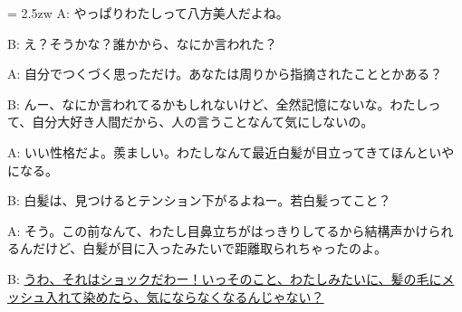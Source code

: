 \documentclass[11pt]{amsart}
\title{}
\author{}
\newenvironment{hangall}[1]{\hangindent = 2.5zw\everypar{\hangindent = 2.5zw}}{}
\begin{document}
\maketitle
\begin{hangall}{}%
A: やっぱりわたしって八方美人だよね。

B: え？そうかな？誰かから、なにか言われた？

A: 自分でつくづく思っただけ。あなたは周りから指摘されたこととかある？

B: んー、なにか言われてるかもしれないけど、全然記憶にないな。わたしって、自分大好き人間だから、人の言うことなんて気にしないの。

A: いい性格だよ。羨ましい。わたしなんて最近白髪が目立ってきてほんといやになる。

B: 白髪は、見つけるとテンション下がるよねー。若白髪ってこと？

A: そう。この前なんて、わたし目鼻立ちがはっきりしてるから結構声かけられるんだけど、白髪が目に入ったみたいで距離取られちゃったのよ。

B: \ul{うわ、それはショックだわー！いっそのこと、わたしみたいに、髪の毛にメッシュ入れて染めたら、気にならなくなるんじゃない？}\end{hangall}
\end{document}
